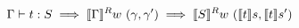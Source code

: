 

\begin{theorem}
  \begin{displaymath}
    {\Gamma} \vdash t : S \implies \llbracket {\Gamma} \rrbracket^R w~(\gamma, \gamma') \implies \llbracket S \rrbracket^R w~(\llbracket t \rrbracket s, \llbracket t \rrbracket s')
  \end{displaymath}
\end{theorem}


